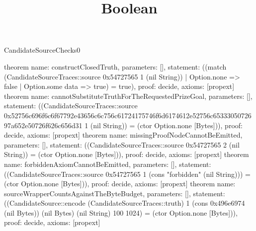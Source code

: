 \begin{lexlean}{CandidateSourceChecks0}
\title{Boolean}
\begin{semanticmodule}
theorem{
 name: constructClosedTruth,
 parameters: [],
 statement: ((match (CandidateSourceTraces::source 0x54727565 1 (nil String)) | Option.none => false | Option.some data => true) = true),
 proof: decide{},
 axioms: [propext]
}
theorem{
 name: cannotSubstituteTruthForTheRequestedPrizeGoal,
 parameters: [],
 statement: ((CandidateSourceTraces::source 0x52756c696f6c6f67792e43656c6c756c61724175746f6d6174612e52756c6533305072697a652e50726f626c656d31 1 (nil String)) = (ctor Option.none [Bytes])),
 proof: decide{},
 axioms: [propext]
}
theorem{
 name: missingProofNodeCannotBeEmitted,
 parameters: [],
 statement: ((CandidateSourceTraces::source 0x54727565 2 (nil String)) = (ctor Option.none [Bytes])),
 proof: decide{},
 axioms: [propext]
}
theorem{
 name: forbiddenAxiomCannotBeEmitted,
 parameters: [],
 statement: ((CandidateSourceTraces::source 0x54727565 1 (cons "forbidden" (nil String))) = (ctor Option.none [Bytes])),
 proof: decide{},
 axioms: [propext]
}
theorem{
 name: sourceWrapperCountsAgainstTheByteBudget,
 parameters: [],
 statement: ((CandidateSource::encode (CandidateSourceTraces::truth) 1 (cons 0x496e6974 (nil Bytes)) (nil Bytes) (nil String) 100 1024) = (ctor Option.none [Bytes])),
 proof: decide{},
 axioms: [propext]
}
\end{semanticmodule}
\end{lexlean}
